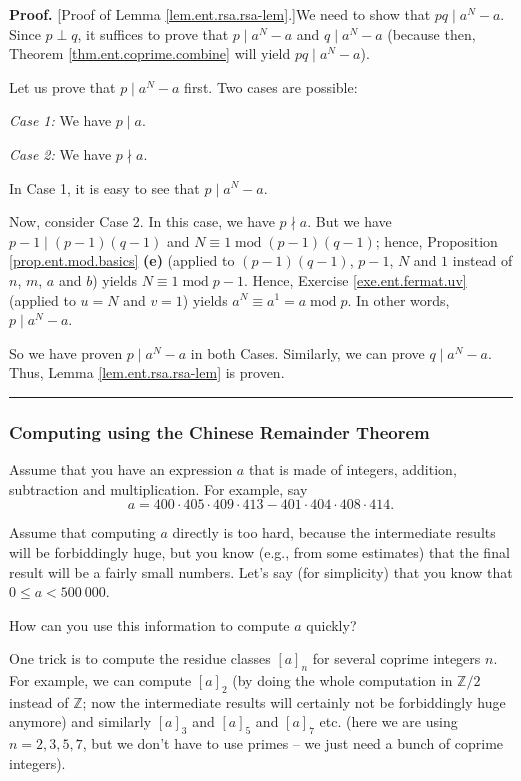 \documentclass[numbers=enddot,12pt,final,onecolumn,notitlepage]{scrartcl}%
\numberwithin{exer}{subsection}
\theoremstyle{definition}
\newenvironment{proof}[1][Proof]{\noindent\textbf{#1.} }{\ \rule{0.5em}{0.5em}}
\begin{document}
\begin{proof}
[Proof of Lemma \ref{lem.ent.rsa.rsa-lem}.]We need to show that $pq\mid
a^{N}-a$. Since $p\perp q$, it suffices to prove that $p\mid a^{N}-a$ and
$q\mid a^{N}-a$ (because then, Theorem \ref{thm.ent.coprime.combine} will
yield $pq\mid a^{N}-a$).

Let us prove that $p\mid a^{N}-a$ first. Two cases are possible:

\textit{Case 1:} We have $p\mid a$.

\textit{Case 2:} We have $p\nmid a$.

In Case 1, it is easy to see that $p\mid a^{N}-a$.

Now, consider Case 2. In this case, we have $p\nmid a$. But we have
$p-1\mid\left(  p-1\right)  \left(  q-1\right)  $ and $N\equiv
1\operatorname{mod}\left(  p-1\right)  \left(  q-1\right)  $; hence,
Proposition \ref{prop.ent.mod.basics} \textbf{(e)} (applied to $\left(
p-1\right)  \left(  q-1\right)  $, $p-1$, $N$ and $1$ instead of $n$, $m$, $a$
and $b$) yields $N\equiv1\operatorname{mod}p-1$. Hence, Exercise
\ref{exe.ent.fermat.uv} (applied to $u=N$ and $v=1$) yields $a^{N}\equiv
a^{1}=a\operatorname{mod}p$. In other words, $p\mid a^{N}-a$.

So we have proven $p\mid a^{N}-a$ in both Cases. Similarly, we can prove
$q\mid a^{N}-a$. Thus, Lemma \ref{lem.ent.rsa.rsa-lem} is proven.
\end{proof}

\subsubsection{Computing using the Chinese Remainder Theorem}

Assume that you have an expression $a$ that is made of integers, addition,
subtraction and multiplication. For example, say%
\[
a=400\cdot405\cdot409\cdot413-401\cdot404\cdot408\cdot414.
\]


Assume that computing $a$ directly is too hard, because the intermediate
results will be forbiddingly huge, but you know (e.g., from some estimates)
that the final result will be a fairly small numbers. Let's say (for
simplicity) that you know that $0\leq a<500\ 000$.

How can you use this information to compute $a$ quickly?

One trick is to compute the residue classes $\left[  a\right]  _{n}$ for
several coprime integers $n$. For example, we can compute $\left[  a\right]
_{2}$ (by doing the whole computation in $\mathbb{Z}/2$ instead of
$\mathbb{Z}$; now the intermediate results will certainly not be forbiddingly
huge anymore) and similarly $\left[  a\right]  _{3}$ and $\left[  a\right]
_{5}$ and $\left[  a\right]  _{7}$ etc. (here we are using $n=2,3,5,7$, but we
don't have to use primes -- we just need a bunch of coprime integers).
\end{document}
